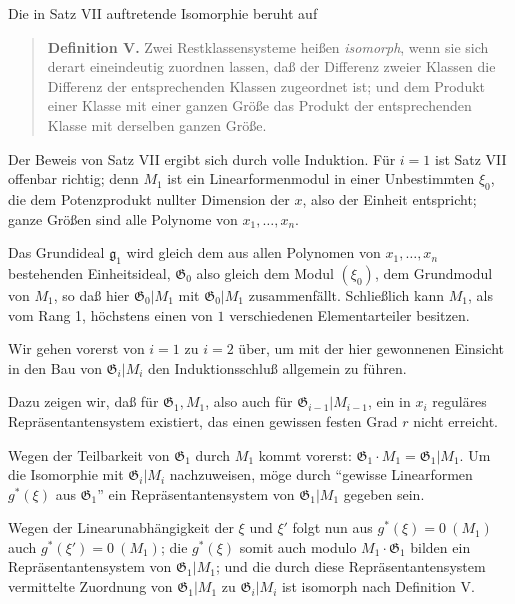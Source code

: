 \documentclass[fontsize=10pt,paper=a5,pagesize,headings=small]{scrbook}
\newcommand{\ideal}[1]{\mathfrak{#1}}
\theoremstyle{plain}
\begin{document}
Die in Satz VII auftretende Isomorphie beruht auf

\begin{quote}
\textbf{Definition V.} Zwei Restklassensysteme heißen \textit{isomorph}, wenn sie sich derart
eineindeutig zuordnen lassen, daß der Differenz zweier Klassen die Differenz der
entsprechenden Klassen zugeordnet ist; und dem Produkt einer Klasse mit einer ganzen
Größe das Produkt der entsprechenden Klasse mit derselben ganzen Größe.
\end{quote}

Der Beweis von Satz VII ergibt sich durch volle Induktion. Für $i=1$ ist Satz VII
offenbar richtig; denn $M_1$ ist ein Linearformenmodul in einer Unbestimmten $\xi_0$, die
dem Potenzprodukt nullter Dimension der $x$, also der Einheit entspricht; ganze Größen
sind alle Polynome von $x_1,\dots,x_n$.

Das Grundideal $\ideal{g}_1$ wird gleich dem aus allen Polynomen von $x_1,\dots,x_n$ bestehenden
Einheitsideal, $\mathfrak{G}_0$ also gleich dem Modul $(\xi_0)$, dem Grundmodul von $M_1$, so daß hier
$\mathfrak{G}_0|M_1$ mit $\mathfrak{G}_0|M_1$ zusammenfällt. Schließlich kann $M_1$, als vom Rang 1, höchstens einen
von $1$ verschiedenen Elementarteiler besitzen.

Wir gehen vorerst von $i=1$ zu $i=2$ über, um mit der hier gewonnenen Einsicht
in den Bau von $\mathfrak{G}_i|M_i$ den Induktionsschluß allgemein zu führen.

\newpage
\setcounter{page}{435}

Dazu zeigen wir, daß für $\mathfrak{G}_1, M_1$, also auch für $\mathfrak{G}_{i-1}|M_{i-1}$, ein in $x_i$ reguläres
Repräsentantensystem existiert, das einen gewissen festen Grad $r$ nicht erreicht.

Wegen der Teilbarkeit von $\mathfrak{G}_1$ durch $M_1$ kommt vorerst: $\mathfrak{G}_1 \cdot M_1 = \mathfrak{G}_1|M_1$.
Um die Isomorphie mit $\mathfrak{G}_i|M_i$ nachzuweisen, möge durch ``gewisse Linearformen
$g^*(\xi)$ aus $\mathfrak{G}_1$'' ein Repräsentantensystem von $\mathfrak{G}_1|M_1$ gegeben sein.

Wegen der Linearunabhängigkeit der $\xi$ und $\xi'$ folgt nun aus $g^*(\xi) = 0\ (M_1)$
auch $g^*(\xi') = 0\ (M_1)$; die $g^*(\xi)$ somit auch modulo $M_1 \cdot \mathfrak{G}_1$ bilden ein
Repräsentantensystem von $\mathfrak{G}_1|M_1$; und die durch diese Repräsentantensystem vermittelte
Zuordnung von $\mathfrak{G}_1|M_1$ zu $\mathfrak{G}_i|M_i$ ist isomorph nach Definition V.
\end{document}
